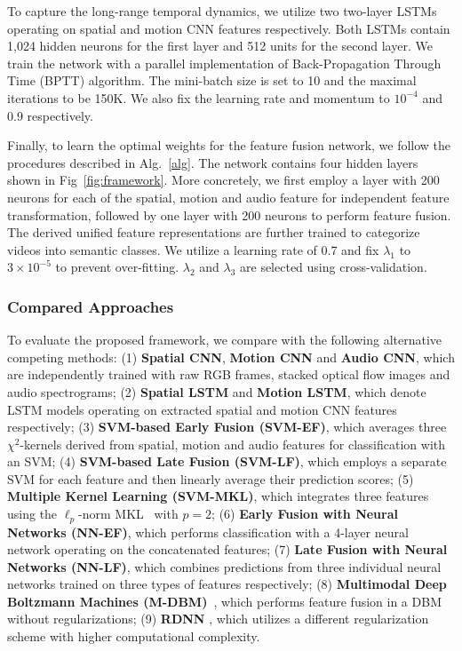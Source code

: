 \documentclass[journal]{IEEEtran}
\begin{document}
To capture the long-range temporal dynamics, we utilize two two-layer LSTMs operating on spatial and motion CNN features respectively. Both LSTMs contain 1,024 hidden neurons for the first layer and 512 units for the second layer. We train the network with a parallel implementation of Back-Propagation Through Time (BPTT) algorithm. The mini-batch size is set to 10 and the maximal iterations to be 150K. We also fix the learning rate and momentum to $10^{-4}$ and 0.9 respectively.


Finally, to learn the optimal weights for the feature fusion network, we follow the procedures described in Alg.~\ref{alg}. The network contains four hidden layers shown in Fig~\ref{fig:framework}. More concretely, we first employ a layer with 200 neurons for each of the spatial, motion and audio feature for independent feature transformation, followed by one layer with 200 neurons to perform feature fusion. The  derived unified feature representations are further trained to categorize videos into semantic classes. We utilize a learning rate of 0.7 and fix $\lambda_{1}$ to $3 \times 10^{-5} $ to prevent over-fitting. $\lambda_{2}$ and $\lambda_{3}$ are selected using cross-validation.

\subsubsection{Compared Approaches}

To evaluate the proposed framework, we compare with the following alternative competing methods: (1) \textbf{Spatial CNN}, \textbf{Motion CNN} and \textbf{Audio CNN}, which are independently trained with raw RGB frames, stacked optical flow images and audio spectrograms; (2) \textbf{Spatial LSTM} and \textbf{Motion LSTM}, which denote LSTM models operating on extracted spatial and motion CNN features respectively; (3) \textbf{SVM-based Early Fusion (SVM-EF)}, which averages three $\chi^2$-kernels derived from spatial, motion and audio features for classification with an SVM; (4) \textbf{SVM-based Late Fusion (SVM-LF)}, which employs a separate SVM for each feature and then linearly average their prediction scores; (5) \textbf{Multiple Kernel Learning (SVM-MKL)}, which integrates three features using the $\ell_p$-norm MKL~\cite{kloft2011lp} with $p=2$; 
(6) \textbf{Early Fusion with Neural Networks (NN-EF)}, which performs classification with a 4-layer neural network operating on the concatenated features; (7) \textbf{Late Fusion with Neural Networks (NN-LF)}, which combines predictions from three individual neural networks trained on three types of features respectively; (8) \textbf{Multimodal Deep Boltzmann Machines (M-DBM)}~\cite{ngiam2011multimodal,srivastava2012multimodal}, which performs feature fusion in a DBM without regularizations; (9) \textbf{RDNN} \cite{mm14:videoclassification}, which utilizes a different regularization scheme with higher computational complexity.
\end{document}
